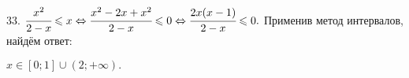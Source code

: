33. $\cfrac{x^2}{2-x}\leqslant x \Leftrightarrow\cfrac{x^2-2x+x^2}{2-x}\leqslant 0\Leftrightarrow\cfrac{2x(x-1)}{2-x}\leqslant 0.$
Применив метод интервалов, найдём ответ:
\begin{figure}[ht!]
\end{figure}
$x\in[0;1]\cup(2;+\infty).$\\

